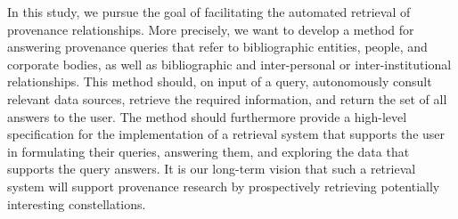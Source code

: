 In this study, we pursue the goal of facilitating
the automated retrieval of provenance relationships.
More precisely,
we want to develop a method for answering provenance queries that refer to bibliographic entities, people, and corporate bodies,
as well as bibliographic and inter-personal or inter-institutional relationships.
This method should, on input of a query,
autonomously consult relevant data sources,
retrieve the required information, and return the set of all answers to the user.
The method should furthermore provide a high-level specification
for the implementation of a retrieval system
that supports the user in formulating their queries, answering them, and exploring the data that supports the query answers.
It is our long-term vision that such a retrieval system will support provenance research
by prospectively retrieving potentially interesting constellations.

%


